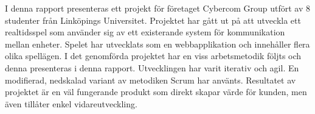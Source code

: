I denna rapport presenteras ett projekt för företaget Cybercom Group utfört av 8 studenter från Linköpings Universitet. Projektet har gått ut på att utveckla ett realtidsspel som använder sig av ett existerande system för kommunikation mellan enheter. Spelet har utvecklats som en webbapplikation och innehåller flera olika spellägen. I det genomförda projektet har en viss arbetsmetodik följts och denna presenteras i denna rapport. Utvecklingen har varit iterativ och agil. En modifierad, nedskalad variant av metodiken Scrum har använts. Resultatet av projektet är en väl fungerande produkt som direkt skapar värde för kunden, men även tillåter enkel vidareutveckling.
